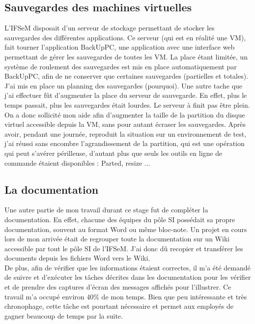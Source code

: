 \subsection{Sauvegardes des machines virtuelles}
L'IFSeM disposait d'un serveur de stockage permettant de stocker les sauvegardes des différentes applications. Ce serveur (qui est en réalité une VM), fait tourner l'application BackUpPC, une application avec une interface web permettant de gérer les sauvegardes de toutes les VM. La place étant limitée, un système de roulement des sauvegardes est mis en place automatiquement par BackUpPC, afin de ne conserver que certaines sauvegardes (partielles et totales). \\
J'ai mis en place un planning des sauvegardes (pourquoi). Une autre tache que j'ai effectuer fût d'augmenter la place du serveur de sauvegarde. En effet, plus le temps passait, plus les sauvegardes était lourdes. Le serveur à finit pas être plein. On a donc sollicité mon aide afin d'augmenter la taille de la partition du disque virtuel accessible depuis la VM, sans pour autant écraser les sauvegardes. Après avoir, pendant une journée, reproduit la situation sur un environnement de test, j'ai réussi sans encombre l'agrandissement de la partition, qui est une opération qui peut s'avérer périlleuse, d'autant plus que seuls les outils en ligne de commande étaient disponibles : Parted, resize ...

\subsection{La documentation}
Une autre partie de mon travail durant ce stage fut de compléter la documentation. En effet, chacune des équipes du pôle SI possédait sa propre documentation, souvent au format Word ou même bloc-note. Un projet en cours lors de mon arrivée était de regrouper toute la documentation sur un Wiki accessible par tout le pôle SI de l'IFSeM. J'ai donc dû recopier et transférer les documents depuis les fichiers Word vers le Wiki. \\
De plus, afin de vérifier que les informations étaient correctes, il m'a été demandé de suivre et d'exécuter les tâches décrites dans les documentation pour les vérifier et de prendre des captures d'écran des messages affichés pour l'illustrer. 
Ce travail m'a occupé environ 40\% de mon temps. Bien que peu intéressante et très chronophage, cette tâche est pourtant nécessaire et permet aux employés de gagner beaucoup de temps par la suite.
